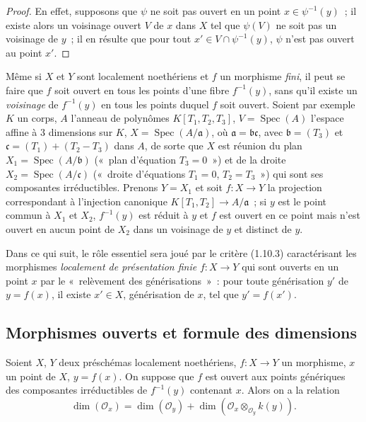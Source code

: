 \begin{proof}
En effet, supposons que $\psi$ ne soit pas ouvert en un point
$x\in\psi^{-1}(y)$~; il existe alors un voisinage ouvert $V$ de $x$ dans $X$ tel
que $\psi(V)$ ne soit pas un voisinage de $y$~; il en résulte que pour tout
$x'\in V\cap\psi^{-1}(y)$, $\psi$ n'est pas ouvert au point $x'$.
\end{proof}

\begin{remark}[14.1.5]
\label{IV.14.1.5-fr}
Même si $X$ et $Y$ sont localement noethériens et $f$ un morphisme \emph{fini},
il peut se faire que $f$ soit ouvert en tous les points d'une fibre $f^{-1}(y)$,
sans qu'il existe un \emph{voisinage} de $f^{-1}(y)$ en tous les points duquel $f$
soit ouvert. Soient par exemple $K$ un corps, $A$ l'anneau de polynômes
$K[T_1,T_2,T_3]$, $V=\operatorname{Spec}(A)$ l'espace affine à 3 dimensions sur
$K$, $X=\operatorname{Spec}(A/\mathfrak a)$, où $\mathfrak a=\mathfrak b\mathfrak c$,
avec $\mathfrak b=(T_3)$ et $\mathfrak c=(T_1)+(T_2-T_3)$ dans $A$, de sorte que
$X$ est réunion du plan $X_1=\operatorname{Spec}(A/\mathfrak b)$ («~plan
d'équation $T_3=0$~») et de la droite $X_2=\operatorname{Spec}(A/\mathfrak c)$
(«~droite d'équations $T_1=0$, $T_2=T_3$~») qui sont ses composantes
irréductibles. Prenons $Y=X_1$ et soit $f:X\to Y$ la projection correspondant à
l'injection canonique $K[T_1,T_2]\to A/\mathfrak a$~; si $y$ est le point commun
à $X_1$ et $X_2$, $f^{-1}(y)$ est réduit à $y$ et $f$ est ouvert en ce point mais
n'est ouvert en aucun point de $X_2$ dans un voisinage de $y$ et distinct de $y$.
\end{remark}

\begin{env}[14.1.6]
\label{IV.14.1.6-fr}
Dans ce qui suit, le rôle essentiel sera joué par le critère (1.10.3)
caractérisant les morphismes \emph{localement de présentation finie} $f:X\to Y$
qui sont ouverts en un point $x$ par le «~relèvement des générisations~»~: pour
toute générisation $y'$ de $y=f(x)$, il existe $x'\in X$, générisation de $x$, tel
que $y'=f(x')$.
\end{env}

\subsection{Morphismes ouverts et formule des dimensions}
\label{subsection:IV.14.2-fr}

\begin{theorem}[14.2.1]
\label{IV.14.2.1-fr}
Soient $X$, $Y$ deux préschémas localement noethériens, $f:X\to Y$ un morphisme,
$x$ un point de $X$, $y=f(x)$. On suppose que $f$ est ouvert aux points génériques
des composantes irréductibles de $f^{-1}(y)$ contenant $x$. Alors on a la relation
\begin{equation}
\tag{14.2.1.1}
\label{IV.14.2.1.1-fr}
  \dim(\mathcal O_x)=\dim(\mathcal O_y)+
  \dim(\mathcal O_x\otimes_{\mathcal O_y}k(y)).
\end{equation}
\end{theorem}

